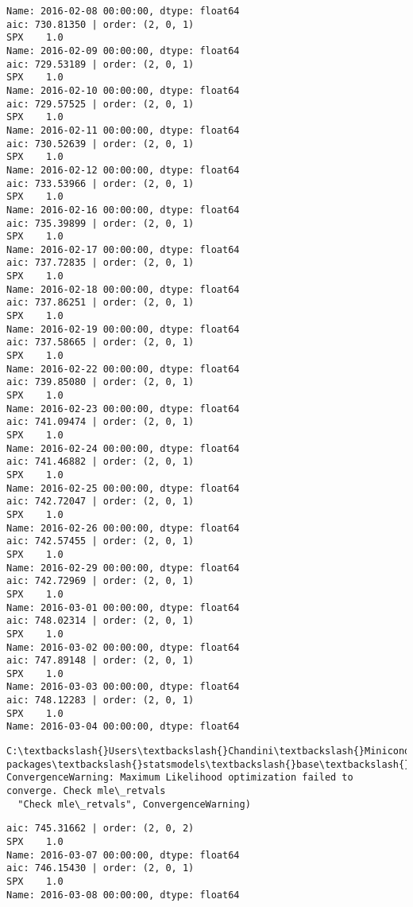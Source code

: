 \documentclass[11pt]{article}
\begin{document}
\begin{Verbatim}[commandchars=\\\{\}]
Name: 2016-02-08 00:00:00, dtype: float64
aic: 730.81350 | order: (2, 0, 1)
SPX    1.0
Name: 2016-02-09 00:00:00, dtype: float64
aic: 729.53189 | order: (2, 0, 1)
SPX    1.0
Name: 2016-02-10 00:00:00, dtype: float64
aic: 729.57525 | order: (2, 0, 1)
SPX    1.0
Name: 2016-02-11 00:00:00, dtype: float64
aic: 730.52639 | order: (2, 0, 1)
SPX    1.0
Name: 2016-02-12 00:00:00, dtype: float64
aic: 733.53966 | order: (2, 0, 1)
SPX    1.0
Name: 2016-02-16 00:00:00, dtype: float64
aic: 735.39899 | order: (2, 0, 1)
SPX    1.0
Name: 2016-02-17 00:00:00, dtype: float64
aic: 737.72835 | order: (2, 0, 1)
SPX    1.0
Name: 2016-02-18 00:00:00, dtype: float64
aic: 737.86251 | order: (2, 0, 1)
SPX    1.0
Name: 2016-02-19 00:00:00, dtype: float64
aic: 737.58665 | order: (2, 0, 1)
SPX    1.0
Name: 2016-02-22 00:00:00, dtype: float64
aic: 739.85080 | order: (2, 0, 1)
SPX    1.0
Name: 2016-02-23 00:00:00, dtype: float64
aic: 741.09474 | order: (2, 0, 1)
SPX    1.0
Name: 2016-02-24 00:00:00, dtype: float64
aic: 741.46882 | order: (2, 0, 1)
SPX    1.0
Name: 2016-02-25 00:00:00, dtype: float64
aic: 742.72047 | order: (2, 0, 1)
SPX    1.0
Name: 2016-02-26 00:00:00, dtype: float64
aic: 742.57455 | order: (2, 0, 1)
SPX    1.0
Name: 2016-02-29 00:00:00, dtype: float64
aic: 742.72969 | order: (2, 0, 1)
SPX    1.0
Name: 2016-03-01 00:00:00, dtype: float64
aic: 748.02314 | order: (2, 0, 1)
SPX    1.0
Name: 2016-03-02 00:00:00, dtype: float64
aic: 747.89148 | order: (2, 0, 1)
SPX    1.0
Name: 2016-03-03 00:00:00, dtype: float64
aic: 748.12283 | order: (2, 0, 1)
SPX    1.0
Name: 2016-03-04 00:00:00, dtype: float64

    \end{Verbatim}

    \begin{Verbatim}[commandchars=\\\{\}]
C:\textbackslash{}Users\textbackslash{}Chandini\textbackslash{}Miniconda3\textbackslash{}envs\textbackslash{}auquan\textbackslash{}lib\textbackslash{}site-packages\textbackslash{}statsmodels\textbackslash{}base\textbackslash{}model.py:496: ConvergenceWarning: Maximum Likelihood optimization failed to converge. Check mle\_retvals
  "Check mle\_retvals", ConvergenceWarning)

    \end{Verbatim}

    \begin{Verbatim}[commandchars=\\\{\}]
aic: 745.31662 | order: (2, 0, 2)
SPX    1.0
Name: 2016-03-07 00:00:00, dtype: float64
aic: 746.15430 | order: (2, 0, 1)
SPX    1.0
Name: 2016-03-08 00:00:00, dtype: float64

    \end{Verbatim}
\end{document}
